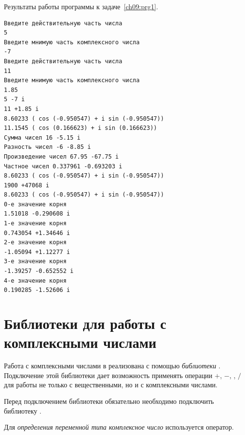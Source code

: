 Результаты работы программы к задаче~\ref{ch09:prg1}.
\begin{verbatim}
Введите действительную часть числа
5
Введите мнимую часть комплексного числа
-7
Введите действительную часть числа
11
Введите мнимую часть комплексного числа
1.85
5 -7 i
11 +1.85 i
8.60233 ( cos (-0.950547) + i sin (-0.950547))
11.1545 ( cos (0.166623) + i sin (0.166623))
Сумма чисел 16 -5.15 i
Разность чисел -6 -8.85 i
Произведение чисел 67.95 -67.75 i
Частное чисел 0.337961 -0.693203 i
8.60233 ( cos (-0.950547) + i sin (-0.950547))
1900 +47068 i
8.60233 ( cos (-0.950547) + i sin (-0.950547))
0-е значение корня
1.51018 -0.290608 i
1-е значение корня
0.743054 +1.34646 i
2-е значение корня
-1.05094 +1.12277 i
3-е значение корня
-1.39257 -0.652552 i
4-е значение корня
0.190285 -1.52606 i
\end{verbatim}



\section[Библиотеки для работы с комплексными числами]{Библиотеки для работы с комплексными числами}
Работа с комплексными числами в  реализована с помощью \emph{библиотеки} 
. Подключение этой библиотеки дает
возможность применять операции $+$, $-$, \Sys{*}, $/$ для работы не только с вещественными, но и с комплексными числами.

Перед подключением библиотеки  обязательно необходимо подключить библиотеку
.

Для \emph{определения переменной 
типа комплексное число} используется оператор.


